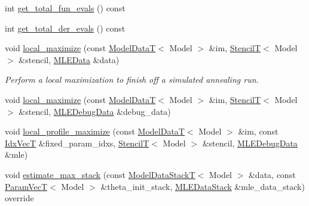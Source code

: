 \begin{DoxyCompactItemize}
\item 
int \hyperlink{classmappel_1_1estimator_1_1IterativeMaximizer_a4ab922cd52088ae3e940e4f0d6fac066}{get\+\_\+total\+\_\+fun\+\_\+evals} () const 
\item 
int \hyperlink{classmappel_1_1estimator_1_1IterativeMaximizer_aa522c84aaaa2b745b3112e9fd2cf4fc9}{get\+\_\+total\+\_\+der\+\_\+evals} () const 
\item 
void \hyperlink{classmappel_1_1estimator_1_1IterativeMaximizer_a35bda016bda047cdd6816ed1a8f76d30}{local\+\_\+maximize} (const \hyperlink{namespacemappel_a97f050df953605381ae9c901c3b125f1}{Model\+DataT}$<$ Model $>$ \&im, \hyperlink{namespacemappel_a3a06598240007876f8c4bf834ad86197}{StencilT}$<$ Model $>$ \&stencil, \hyperlink{namespacemappel_1_1estimator_structmappel_1_1estimator_1_1MLEData}{M\+L\+E\+Data} \&data)
\begin{DoxyCompactList}\small\item\em Perform a local maximization to finish off a simulated annealing run. \end{DoxyCompactList}\item 
void \hyperlink{classmappel_1_1estimator_1_1IterativeMaximizer_a2fd6152953dcc530a23350dcc93baf7c}{local\+\_\+maximize} (const \hyperlink{namespacemappel_a97f050df953605381ae9c901c3b125f1}{Model\+DataT}$<$ Model $>$ \&im, \hyperlink{namespacemappel_a3a06598240007876f8c4bf834ad86197}{StencilT}$<$ Model $>$ \&stencil, \hyperlink{namespacemappel_1_1estimator_structmappel_1_1estimator_1_1MLEDebugData}{M\+L\+E\+Debug\+Data} \&debug\+\_\+data)
\item 
void \hyperlink{classmappel_1_1estimator_1_1IterativeMaximizer_acc71726ed0876fd59ce3b07ea9950625}{local\+\_\+profile\+\_\+maximize} (const \hyperlink{namespacemappel_a97f050df953605381ae9c901c3b125f1}{Model\+DataT}$<$ Model $>$ \&im, const \hyperlink{namespacemappel_ac63743dcd42180127307cd0e4ecdd784}{Idx\+VecT} \&fixed\+\_\+param\+\_\+idxs, \hyperlink{namespacemappel_a3a06598240007876f8c4bf834ad86197}{StencilT}$<$ Model $>$ \&stencil, \hyperlink{namespacemappel_1_1estimator_structmappel_1_1estimator_1_1MLEDebugData}{M\+L\+E\+Debug\+Data} \&mle)
\item 
void \hyperlink{classmappel_1_1estimator_1_1ThreadedEstimator_a797b6479fbab450a42099cfdb07e900f}{estimate\+\_\+max\+\_\+stack} (const \hyperlink{namespacemappel_aaeb6665bc57476dd93c2df6ad8bc4768}{Model\+Data\+StackT}$<$ Model $>$ \&data, const \hyperlink{namespacemappel_a0f86d3153e4e27b095012f140eea58de}{Param\+VecT}$<$ Model $>$ \&theta\+\_\+init\+\_\+stack, \hyperlink{namespacemappel_1_1estimator_structmappel_1_1estimator_1_1MLEDataStack}{M\+L\+E\+Data\+Stack} \&mle\+\_\+data\+\_\+stack) override

\end{DoxyCompactItemize}
